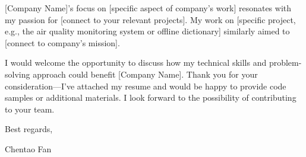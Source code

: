 \documentclass{letter}
\newcommand{\yourname}{Chentao Fan}
\begin{document}
\begin{letter}
    [Company Name]'s focus on [specific aspect of company's work] resonates with my passion for [connect to your relevant projects]. My work on [specific project, e.g., the air quality monitoring system or offline dictionary] similarly aimed to [connect to company's mission].

    I would welcome the opportunity to discuss how my technical skills and problem-solving approach could benefit [Company Name]. Thank you for your consideration—I've attached my resume and would be happy to provide code samples or additional materials. I look forward to the possibility of contributing to your team.

    \closing{Best regards,}
    \yourname

\end{letter}
\end{document}
